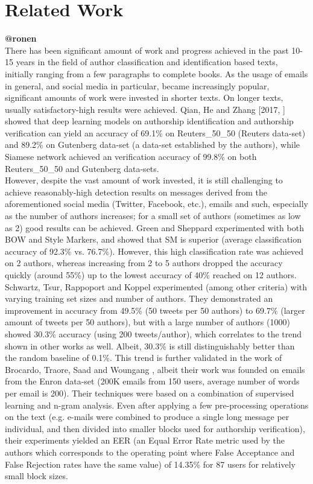 \documentclass[a4paper]{article}
\begin{document}
\section{Related Work}
\label{Related Work}
\textbf{@ronen}\\
There has been significant amount of work and progress achieved in the past 10-15 years in the field of author classification and identification based texts, initially ranging from a few paragraphs to complete books. As the usage of emails in general, and social media in particular, became increasingly popular, significant amounts of work were invested in shorter texts.
On longer texts, usually satisfactory-high results were achieved. Qian, He and Zhang [2017, \cite{qian}] showed that deep learning models on authorship identification and authorship verification can yield an accuracy of 69.1\% on Reuters\_50\_50 (Reuters data-set) and 89.2\% on Gutenberg data-set (a data-set established by the authors), while Siamese network achieved an verification accuracy of 99.8\% on both Reuters\_50\_50 and Gutenberg data-sets.\\
However, despite the vast amount of work invested, it is still challenging to achieve reasonably-high detection results on messages derived from the aforementioned social media (Twitter, Facebook, etc.), emails and such, especially as the number of authors increases; for a small set of authors (sometimes as low as 2) good results can be achieved. Green and Sheppard \cite{rachel} experimented with both BOW and Style Markers, and showed that SM is superior (average classification accuracy of 92.3\% vs. 76.7\%). However, this high classification rate was achieved on 2 authors, whereas increasing from 2 to 5 authors dropped the accuracy quickly (around 55\%) up to the lowest accuracy of 40\% reached on 12 authors.
Schwartz, Tsur, Rappoport and Koppel \cite{schwartz} experimented (among other criteria) with varying training set sizes and number of authors. They demonstrated an improvement in accuracy from 49.5\% (50 tweets per 50 authors) to 69.7\% (larger amount of tweets per 50 authors), but with a large number of authors (1000) showed 30.3\% accuracy (using 200 tweets/author), which correlates to the trend shown in other works as well. Albeit, 30.3\% is still  distinguishably better than the random baseline of 0.1\%.
This trend is further validated in the work of Brocardo, Traore, Saad and Woungang \cite{brocardo}, albeit their work was founded on emails from the Enron data-set (200K emails from 150 users, average number of words per email is 200). Their techniques were based on a combination of supervised learning and n-gram analysis. Even after applying a few pre-processing operations on the text (e.g. e-mails were combined to produce a single long message per individual, and then divided into smaller blocks used for authorship verification), their experiments yielded an EER (an Equal Error Rate metric used by the authors which corresponds to the operating point where False Acceptance and False Rejection rates have the same value) of 14.35\% for 87 users for relatively small block sizes.\\
\end{document}
